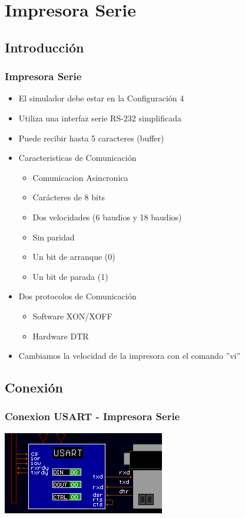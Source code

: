 \documentclass{beamer}
\begin{document}
\section{Impresora Serie}
\subsection{Introducción}
\begin{frame}[fragile]
\frametitle{Impresora Serie}
\begin{itemize}
 \item El simulador debe estar en la Configuración 4
 \item Utiliza una interfaz serie RS-232 simplificada
 \item Puede recibir hasta 5 caracteres (buffer)
 \item Caracteristicas de Comunicación
 \begin{itemize}
  \item Comunicacion Asincronica
  \item Carácteres de 8 bits
  \item Dos velocidades (6 baudios y 18 baudios)
  \item Sin paridad
  \item Un bit de arranque (0)
  \item Un bit de parada (1)
 \end{itemize}
  \item Dos protocolos de Comunicación
\begin{itemize}
 \item Software XON/XOFF
 \item Hardware DTR
\end{itemize}
\item Cambiamos la velocidad de la impresora con el comando ''vi''
\end{itemize}
\end{frame}

\subsection{Conexión}
\begin{frame}[fragile]
\frametitle{Conexion USART - Impresora Serie}
\begin{center}
 \includegraphics[scale=1.00]{conexion_usart.png}
\end{center}

\end{frame}
\end{document}
